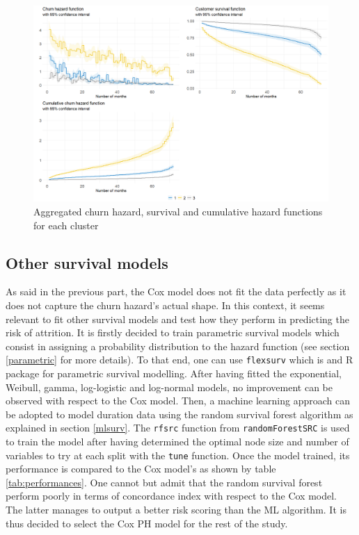 \documentclass[
]{book}
\begin{document}
\begin{figure}

{\centering \includegraphics[width=20.83in]{./imgs/churn_surv_clust} 

}

\caption{Aggregated churn hazard, survival and cumulative hazard functions for each cluster}\label{fig:coxclust}
\end{figure}

\hypertarget{other-survival-models}{%
\subsection{Other survival models}\label{other-survival-models}}

As said in the previous part, the Cox model does not fit the data perfectly as it does not capture the churn hazard's actual shape. In this context, it seems relevant to fit other survival models and test how they perform in predicting the risk of attrition. It is firstly decided to train parametric survival models which consist in assigning a probability distribution to the hazard function (see section \ref{parametric} for more details). To that end, one can use \texttt{flexsurv} \citep{flexsurv2016} which is and R package for parametric survival modelling. After having fitted the exponential, Weibull, gamma, log-logistic and log-normal models, no improvement can be observed with respect to the Cox model. Then, a machine learning approach can be adopted to model duration data using the random survival forest algorithm as explained in section \ref{mlsurv}. The \texttt{rfsrc} function from \texttt{randomForestSRC} \citep{randomForestSRC2008} is used to train the model after having determined the optimal node size and number of variables to try at each split with the \texttt{tune} function. Once the model trained, its performance is compared to the Cox model's as shown by table \ref{tab:performances}. One cannot but admit that the random survival forest perform poorly in terms of concordance index with respect to the Cox model. The latter manages to output a better risk scoring than the ML algorithm. It is thus decided to select the Cox PH model for the rest of the study.
\end{document}
